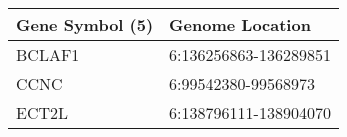 \begin{tabular}{ll}
\toprule
Gene Symbol (5) &       Genome Location \\
\midrule
         BCLAF1 & 6:136256863-136289851 \\
           CCNC &   6:99542380-99568973 \\
          ECT2L & 6:138796111-138904070 \\
\bottomrule
\end{tabular}
